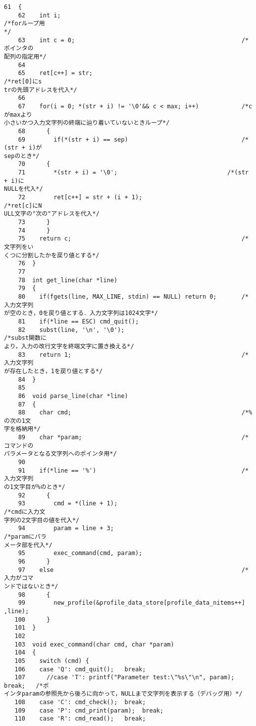 \begin{Verbatim}[fontsize=\small, baselinestretch=0.8]
    61	{
    62	  int i;                                                   /*forループ用
*/
    63	  int c = 0;                                               /*ポインタの
配列の指定用*/
    64	
    65	  ret[c++] = str;                                            /*ret[0]にs
trの先頭アドレスを代入*/
    66	
    67	  for(i = 0; *(str + i) != '\0'&& c < max; i++)            /*cがmaxより
小さいかつ入力文字列の終端に辿り着いていないときループ*/
    68	    {
    69	      if(*(str + i) == sep)                                /*(str + i)が
sepのとき*/
    70		{
    71		  *(str + i) = '\0';                               /*(str + i)に
NULLを代入*/
    72		  ret[c++] = str + (i + 1);                          /*ret[c]にN
ULL文字の"次の"アドレスを代入*/
    73		}
    74	    }
    75	  return c;                                                /*文字列をい
くつに分割したかを戻り値とする*/
    76	}
    77	
    78	int get_line(char *line)
    79	{
    80	  if(fgets(line, MAX_LINE, stdin) == NULL) return 0;       /*入力文字列
が空のとき，0を戻り値とする．入力文字列は1024文字*/
    81	  if(*line == ESC) cmd_quit();
    82	  subst(line, '\n', '\0');                                 /*subst関数に
より，入力の改行文字を終端文字に置き換える*/
    83	  return 1;                                                /*入力文字列
が存在したとき，1を戻り値とする*/
    84	}
    85	
    86	void parse_line(char *line)
    87	{
    88	  char cmd;                                                /*%の次の1文
字を格納用*/
    89	  char *param;                                             /*コマンドの
パラメータとなる文字列へのポインタ用*/
    90	
    91	  if(*line == '%')                                         /*入力文字列
の1文字目が%のとき*/
    92	    {
    93	      cmd = *(line + 1);                                   /*cmdに入力文
字列の2文字目の値を代入*/
    94	      param = line + 3;                                    /*paramにパラ
メータ部を代入*/
    95	      exec_command(cmd, param);
    96	    }
    97	  else                                                     /*入力がコマ
ンドではないとき*/
    98	    {
    99	      new_profile(&profile_data_store[profile_data_nitems++] ,line);
   100	    }
   101	}
   102	
   103	void exec_command(char cmd, char *param)
   104	{
   105	  switch (cmd) {
   106	  case 'Q': cmd_quit();   break;
   107	    //case 'T': printf("Parameter test:\"%s\"\n", param); break;   /*ポ
インタparamの参照先から後ろに向かって，NULLまで文字列を表示する（デバッグ用）*/
   108	  case 'C': cmd_check();  break;
   109	  case 'P': cmd_print(param);  break;
   110	  case 'R': cmd_read();   break;

\end{Verbatim}
